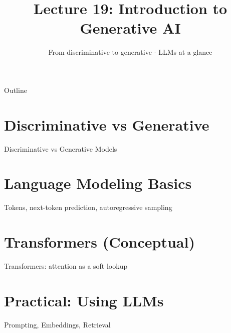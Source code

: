 \documentclass[aspectratio=169]{beamer}
\title{Lecture 19: Introduction to Generative AI}
\subtitle{From discriminative to generative $\cdot$ LLMs at a glance}
\date{}
\begin{document}
\begin{frame}\titlepage\end{frame}

\begin{frame}{Outline}
  \tableofcontents
\end{frame}

\section{Discriminative vs Generative}
\begin{frame}{Discriminative vs Generative Models}
\end{frame}

\section{Language Modeling Basics}
\begin{frame}{Tokens, next-token prediction, autoregressive sampling}
\end{frame}

\section{Transformers (Conceptual)}
\begin{frame}{Transformers: attention as a soft lookup}
\end{frame}

\section{Practical: Using LLMs}
\begin{frame}{Prompting, Embeddings, Retrieval}
\end{frame}
\end{document}
